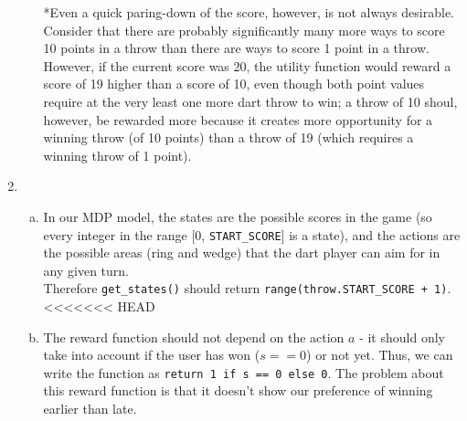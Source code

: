 \documentclass{article}
\begin{document}
\begin{enumerate}
\begin{enumerate}[(a)]
                *Even a quick paring-down of the score, however, is not always desirable. Consider that there are probably significantly many more ways to score 10 points in a throw than there are ways to score 1 point in a throw. However, if the current score was 20, the utility function would reward a score of 19 higher than a score of 10, even though both point values require at the very least one more dart throw to win; a throw of 10 shoul, however, be rewarded more because it creates more opportunity for a winning throw (of 10 points) than a throw of 19 (which requires a winning throw of 1 point).
            \end{enumerate}
        \item
            \begin{enumerate}[(a)]
                \item In our MDP model, the states are the possible scores in the game (so every integer in the range [0, \texttt{START\_SCORE}] is a state), and the actions are the possible areas (ring and wedge) that the dart player can aim for in any given turn. \\

                Therefore \texttt{get\_states()} should return \texttt{range(throw.START\_SCORE + 1)}.
<<<<<<< HEAD
                \item The reward function should not depend on the action $a$ - it should only take into account if the user has won ($s==0$) or not yet.  Thus, we can write the function as \texttt{return 1 if s == 0 else 0}. The problem about this reward function is that it doesn't show our preference of winning earlier than late.\\
                

\end{enumerate}
\end{enumerate}
\end{document}
